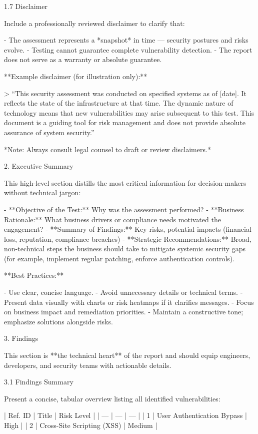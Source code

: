  1.7 Disclaimer

Include a professionally reviewed disclaimer to clarify that:

- The assessment represents a *snapshot* in time — security postures and risks evolve.
- Testing cannot guarantee complete vulnerability detection.
- The report does not serve as a warranty or absolute guarantee.

**Example disclaimer (for illustration only):**

> “This security assessment was conducted on specified systems as of [date]. It reflects the state of the infrastructure at that time. The dynamic nature of technology means that new vulnerabilities may arise subsequent to this test. This document is a guiding tool for risk management and does not provide absolute assurance of system security.”


*Note: Always consult legal counsel to draft or review disclaimers.*


2. Executive Summary

This high-level section distills the most critical information for decision-makers without technical jargon:

- **Objective of the Test:** Why was the assessment performed?
- **Business Rationale:** What business drivers or compliance needs motivated the engagement?
- **Summary of Findings:** Key risks, potential impacts (financial loss, reputation, compliance breaches)
- **Strategic Recommendations:** Broad, non-technical steps the business should take to mitigate systemic security gaps (for example, implement regular patching, enforce authentication controls).

**Best Practices:**

- Use clear, concise language.
- Avoid unnecessary details or technical terms.
- Present data visually with charts or risk heatmaps if it clarifies messages.
- Focus on business impact and remediation priorities.
- Maintain a constructive tone; emphasize solutions alongside risks.


3. Findings

This section is **the technical heart** of the report and should equip engineers, developers, and security teams with actionable details.

 3.1 Findings Summary

Present a concise, tabular overview listing all identified vulnerabilities:

| Ref. ID | Title | Risk Level |
| --- | --- | --- |
| 1 | User Authentication Bypass | High |
| 2 | Cross-Site Scripting (XSS) | Medium |



